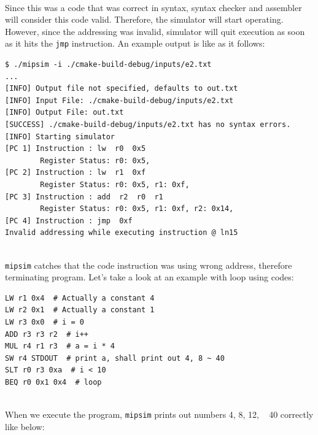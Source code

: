 \documentclass{homework}
\begin{document}
\\
Since this was a code that was correct in syntax, syntax checker and assembler will consider this code valid. Therefore, the simulator will start operating. However, since the addressing was invalid, simulator will quit execution as soon as it hits the \texttt{jmp} instruction. An example output is like as it follows:
\\
\begin{center}
\begin{code}
\begin{verbatim}
$ ./mipsim -i ./cmake-build-debug/inputs/e2.txt
...
[INFO] Output file not specified, defaults to out.txt
[INFO] Input File: ./cmake-build-debug/inputs/e2.txt
[INFO] Output File: out.txt
[SUCCESS] ./cmake-build-debug/inputs/e2.txt has no syntax errors.
[INFO] Starting simulator
[PC 1] Instruction : lw  r0  0x5
        Register Status: r0: 0x5,
[PC 2] Instruction : lw  r1  0xf
        Register Status: r0: 0x5, r1: 0xf,
[PC 3] Instruction : add  r2  r0  r1
        Register Status: r0: 0x5, r1: 0xf, r2: 0x14,
[PC 4] Instruction : jmp  0xf
Invalid addressing while executing instruction @ ln15
\end{verbatim}
\end{code}
\end{center}
\\
\texttt{mipsim} catches that the code instruction was using wrong address, therefore terminating program. Let's take a look at an example with loop using codes:
\\
\begin{center}
\begin{code}
\begin{verbatim}
LW r1 0x4  # Actually a constant 4
LW r2 0x1  # Actually a constant 1
LW r3 0x0  # i = 0
ADD r3 r3 r2  # i++
MUL r4 r1 r3  # a = i * 4
SW r4 STDOUT  # print a, shall print out 4, 8 ~ 40
SLT r0 r3 0xa  # i < 10
BEQ r0 0x1 0x4  # loop
\end{verbatim}
\end{code}
\end{center}
\\
When we execute the program, \texttt{mipsim} prints out numbers 4, 8, 12, ~ 40 correctly like below:
\\
\end{document}
